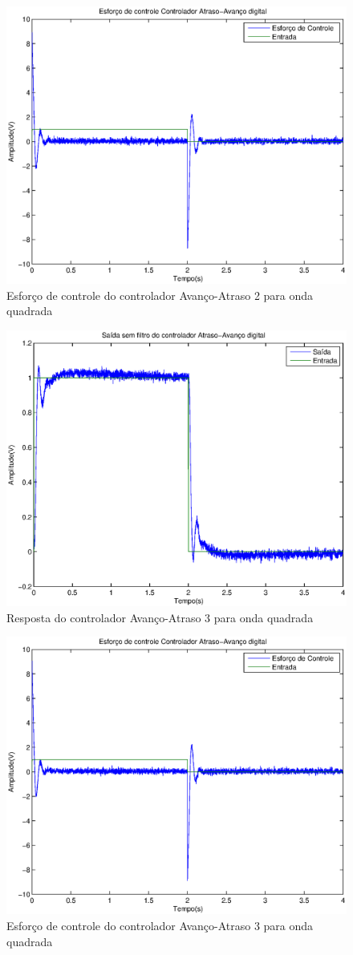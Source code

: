 \documentclass{article}
\begin{document}
\begin{figure}[H]
	\centering
	\includegraphics[width=0.8\linewidth]{upid50}
	\caption{Esforço de controle do controlador Avanço-Atraso 2 para onda quadrada}
	\label{fig:upid50}
\end{figure}
\begin{figure}[H]
	\centering
	\includegraphics[width=0.8\linewidth]{ysemfiltro55}
	\caption{Resposta do controlador Avanço-Atraso 3 para onda quadrada}
	\label{fig:ysemfiltro55}
\end{figure}
\begin{figure}[H]
	\centering
	\includegraphics[width=0.8\linewidth]{upid55}
	\caption{Esforço de controle do controlador Avanço-Atraso 3 para onda quadrada}
	\label{fig:upid55}
\end{figure}
\end{document}
